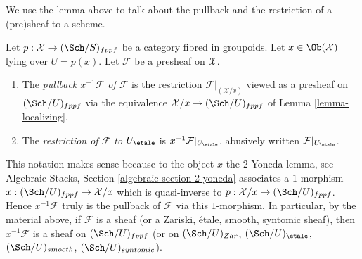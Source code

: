 \noindent
We use the lemma above to talk about the pullback and the restriction
of a (pre)sheaf to a scheme.

\begin{definition}
\label{definition-pullback}
Let $p : \mathcal{X} \to (\Sch/S)_{fppf}$ be a category fibred
in groupoids. Let $x \in \Ob(\mathcal{X})$ lying over $U = p(x)$.
Let $\mathcal{F}$ be a presheaf on $\mathcal{X}$.
\begin{enumerate}
\item The {\it pullback $x^{-1}\mathcal{F}$ of $\mathcal{F}$} is the
restriction $\mathcal{F}|_{(\mathcal{X}/x)}$ viewed as a presheaf on
$(\Sch/U)_{fppf}$ via the equivalence
$\mathcal{X}/x \to (\Sch/U)_{fppf}$ of
Lemma \ref{lemma-localizing}.
\item The {\it restriction of $\mathcal{F}$ to $U_\etale$}
is $x^{-1}\mathcal{F}|_{U_\etale}$, abusively written
$\mathcal{F}|_{U_\etale}$.
\end{enumerate}
\end{definition}

\noindent
This notation makes sense because to the object $x$ the $2$-Yoneda lemma, see
Algebraic Stacks, Section \ref{algebraic-section-2-yoneda}
associates a $1$-morphism $x : (\Sch/U)_{fppf} \to \mathcal{X}/x$
which is quasi-inverse to $p : \mathcal{X}/x \to (\Sch/U)_{fppf}$.
Hence $x^{-1}\mathcal{F}$ truly is the pullback of $\mathcal{F}$ via this
$1$-morphism. In particular, by the material above, if $\mathcal{F}$
is a sheaf (or a Zariski, \'etale, smooth, syntomic sheaf), then
$x^{-1}\mathcal{F}$ is a sheaf on $(\Sch/U)_{fppf}$ (or on
$(\Sch/U)_{Zar}$, $(\Sch/U)_\etale$,
$(\Sch/U)_{smooth}$, $(\Sch/U)_{syntomic}$).

